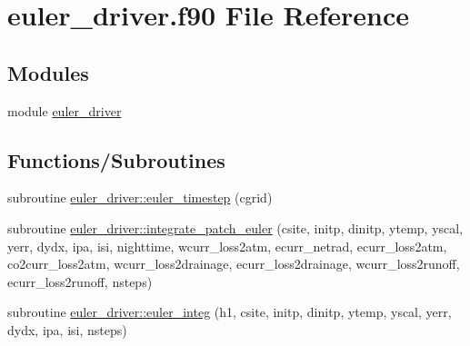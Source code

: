\hypertarget{euler__driver_8f90}{}\section{euler\+\_\+driver.\+f90 File Reference}
\label{euler__driver_8f90}
\subsection*{Modules}
\begin{DoxyCompactItemize}
\item 
module \hyperlink{namespaceeuler__driver}{euler\+\_\+driver}
\end{DoxyCompactItemize}
\subsection*{Functions/\+Subroutines}
\begin{DoxyCompactItemize}
\item 
subroutine \hyperlink{namespaceeuler__driver_a55664cda4554324c478d426edcc090ba}{euler\+\_\+driver\+::euler\+\_\+timestep} (cgrid)
\item 
subroutine \hyperlink{namespaceeuler__driver_ad81ae9c94d4d79e17d02be872e799cbb}{euler\+\_\+driver\+::integrate\+\_\+patch\+\_\+euler} (csite, initp, dinitp, ytemp, yscal, yerr, dydx, ipa, isi, nighttime, wcurr\+\_\+loss2atm, ecurr\+\_\+netrad, ecurr\+\_\+loss2atm, co2curr\+\_\+loss2atm, wcurr\+\_\+loss2drainage, ecurr\+\_\+loss2drainage, wcurr\+\_\+loss2runoff, ecurr\+\_\+loss2runoff, nsteps)
\item 
subroutine \hyperlink{namespaceeuler__driver_a7a9fa033c71fdc8278bcaeb603f004d4}{euler\+\_\+driver\+::euler\+\_\+integ} (h1, csite, initp, dinitp, ytemp, yscal, yerr, dydx, ipa, isi, nsteps)
\end{DoxyCompactItemize}
